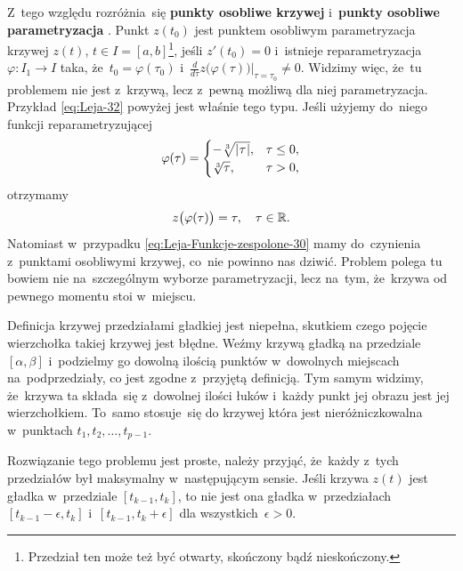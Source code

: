\documentclass[a4paper,11pt]{article}
\numberwithin{equation}{section}
\begin{document}
Z~tego względu rozróżnia~się \textbf{punkty osobliwe krzywej}
i~\textbf{punkty osobliwe parametryzacja}
\cite{GdowskiElementGeometriiRozniczkowejZZadaniami1999}. Punkt
$z( t_{ 0 } )$ jest punktem osobliwym parametryzacja krzywej $z( t )$,
$t \in I = [ a, b ]$\footnote{Przedział ten może też być otwarty,
  skończony bądź nieskończony.}, jeśli $z'( t_{ 0 } ) = 0$ i~istnieje
reparametryzacja $\varphi: I_{ 1 } \to I$ taka,
że~$t_{ 0 } = \varphi( \tau_{ 0 } )$
i~$\tfrac{ d }{ d \tau } z\big( \varphi( \tau ) \big)|_{ \tau = \tau_{
    0 } } \neq 0$. Widzimy więc, że~tu problemem nie jest z~krzywą,
lecz z~pewną możliwą dla niej parametryzacja. Przykład
\eqref{eq:Leja-32} powyżej jest właśnie tego typu. Jeśli użyjemy
do~niego funkcji reparametryzującej
\begin{equation}
  \label{eq:Leja-Funkcje-zespolone-33}
  \varphi( \tau ) =
  \begin{cases}
    -\sqrt[3]{ | \hspace{0.05em}  \tau  \hspace{0.05em} | }, & \tau \leq 0, \\
    \sqrt[3]{ \tau }, & \tau > 0,
  \end{cases}
\end{equation}
otrzymamy
\begin{equation}
  \label{eq:Leja-Funkcje-zespolone-34}
  z\big( \varphi( \tau ) \big) = \tau, \quad \tau \in \mathbb{R}.
\end{equation}
Natomiast w~przypadku \eqref{eq:Leja-Funkcje-zespolone-30} mamy
do~czynienia z~punktami osobliwymi krzywej, co~nie powinno nas dziwić.
Problem polega tu bowiem nie na~szczególnym wyborze parametryzacji, lecz
na~tym, że~krzywa od pewnego momentu stoi w~miejscu.

\VerSpaceFour





\noindent
{} Definicja krzywej przedziałami gładkiej jest niepełna,
skutkiem czego pojęcie wierzchołka takiej krzywej jest błędne. Weźmy
krzywą gładką na przedziale $[ \alpha, \beta ]$ i~podzielmy go dowolną ilością
punktów w~dowolnych miejscach na~podprzedziały, co jest zgodne z~przyjętą
definicją. Tym samym widzimy, że~krzywa ta składa~się z~dowolnej ilości
łuków i~każdy punkt jej obrazu jest jej wierzchołkiem. To~samo stosuje~się
do krzywej która jest nieróżniczkowalna w~punktach
$t_{ 1 }, t_{ 2 }, \ldots, t_{ p - 1 }$.

Rozwiązanie tego problemu jest proste, należy przyjąć, że~każdy z~tych
przedziałów był maksymalny w~następującym sensie. Jeśli krzywa
$z( t )$ jest gładka w~przedziale $[ t_{ k - 1 }, t_{ k } ]$, to nie
jest ona gładka w~przedziałach $[ t_{ k - 1 } - \epsilon, t_{ k } ]$
i~$[ t_{ k - 1 }, t_{ k } + \epsilon ]$ dla wszystkich~$\epsilon > 0$.
\end{document}
